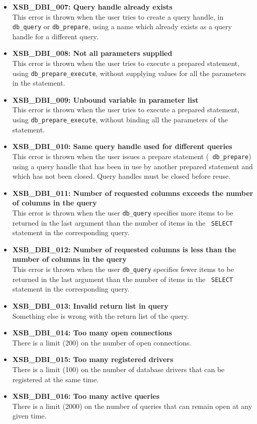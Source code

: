 \begin{itemize}
\item {\bf XSB\_DBI\_007: Query handle already exists}\\
This error is thrown when the user tries to create a query handle, in
{\tt db\_query} or {\tt db\_prepare}, using a name which already exists as
a query handle for a different query.

\item {\bf XSB\_DBI\_008: Not all parameters supplied}\\
This error is thrown when the user tries to execute a prepared statement,
using {\tt db\_prepare\_execute}, without supplying values for all the
parameters in the statement.

\item {\bf XSB\_DBI\_009: Unbound variable in parameter list}\\
This error is thrown when the user tries to execute a prepared statement,
using {\tt db\_prepare\_execute}, without binding all the parameters of the
statement.

\item {\bf XSB\_DBI\_010: Same query handle used for
    different queries}\\
  This error is thrown when the user issues a prepare statement ({\tt
    db\_prepare})  using a query
  handle that has been in use by another prepared statement and which has
  not been closed. Query handles must be closed before reuse.
\item {\bf XSB\_DBI\_011: Number of requested columns exceeds the number of columns in the query}\\
  This error is thrown when the user {\tt db\_query}  specifies more items to be
  returned in the last argument than the number of items in the {\tt
    SELECT} statement in the corresponding query.
\item {\bf XSB\_DBI\_012: Number of requested columns is less than the number of columns in the query}\\
  This error is thrown when the user {\tt db\_query}  specifies fewer items to be
  returned in the last argument than the number of items in the {\tt
    SELECT} statement in the corresponding query.
\item {\bf XSB\_DBI\_013: Invalid return list in query}\\
  Something else is wrong with the return list of the query.
\item {\bf XSB\_DBI\_014: Too many open connections}\\
  There is a limit (200) on the number of open connections.
\item {\bf XSB\_DBI\_015: Too many registered drivers}\\
  There is a limit (100) on the number of database drivers that can be
  registered at the same time.
\item {\bf XSB\_DBI\_016: Too many active queries}\\
  There is a limit (2000) on the number of queries that can remain
  open at any given time.
\end{itemize}

